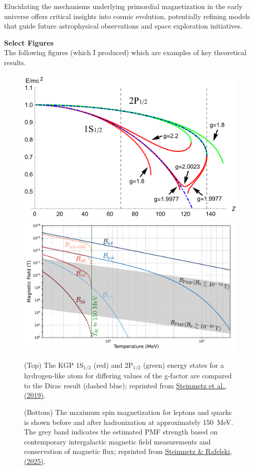 \documentclass[11pt]{article}
\begin{document}
Elucidating the mechanisms underlying primordial magnetization in the early universe offers critical insights into cosmic evolution, potentially refining models that guide future astrophysical observations and space exploration initiatives.

\newpage

{\large\textbf{Select Figures}}\\
The following figures (which I produced) which are examples of key theoretical results.
\begin{figure}[h!]
    \centering
        \includegraphics[width=0.74\linewidth]{Figure_1.pdf}\\
        \includegraphics[width=0.80\linewidth]{Figure_2.pdf}
    \caption{(Top) The KGP 1S\(_{1/2}\) (red) and 2P\(_{1/2}\) (green) energy states for a hydrogen-like atom for differing values of the g-factor are compared to the Dirac result (dashed blue); reprinted from \href{https://doi.org/10.1140/epja/i2019-12715-5}{Steinmetz et al., (2019)}.}
    \label{fig:figure1}
    \caption{(Bottom) The maximum spin magnetization for leptons and quarks is shown before and after hadronization at approximately 150~MeV. The grey band indicates the estimated PMF strength based on contemporary intergalactic magnetic field measurements and conservation of magnetic flux; reprinted from \href{https://doi.org/10.48550/arXiv.2502.05052}{Steinmetz \& Rafelski, (2025)}.}
    \label{fig:figure2}
\end{figure}
\end{document}
